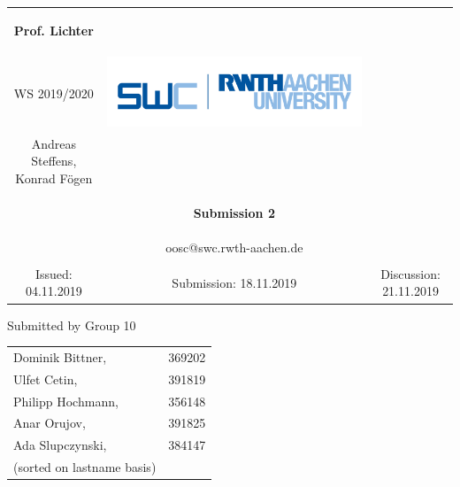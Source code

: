 \documentclass[a4paper,12pt,oneside]{scrreprt}
\begin{document}
	
	\begin{tabular}{ccc}
		\begin{large} \textbf{Prof. Lichter} \end{large} &
		
		\begin{minipage}[H]{3.5cm}
			\centering
			\begin{large} OOSC \end{large} \\
			\begin{large} WS 2019/2020 \end{large}
		\end{minipage} &
		
		\begin{minipage}[H]{4cm}
			\includegraphics[keepaspectratio,width=\textwidth,angle=0]{images/swc.png}
		\end{minipage} \\
		Andreas Steffens, Konrad F\"ogen &  &  \\
		& \begin{huge} \textbf{Submission 2} \end{huge}&  \\
		& oosc@swc.rwth-aachen.de &  \\
		& & \\
		Issued: 04.11.2019 &
		Submission: 18.11.2019 &
		Discussion: 21.11.2019 \\
	\end{tabular}
	\newline \newline \newline
	\centering
	Submitted by Group 10
	
	\begin{tabular}{ll}
		Dominik Bittner, & 369202 \\
		Ulfet Cetin, & 391819\\
		Philipp Hochmann, & 356148 \\
		Anar Orujov, & 391825\\
		Ada Slupczynski, & 384147\\
		(sorted on lastname basis)
	\end{tabular}
	
\end{document}
